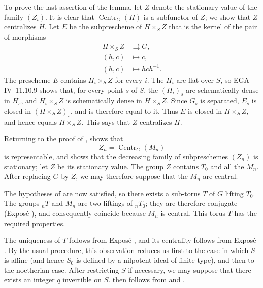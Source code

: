 To prove the last assertion of the lemma, let \(Z\) denote the
stationary value of the family \((Z_i)\). It is clear that
\(\operatorname{Centr}_G(H)\) is a subfunctor of \(Z\); we show that
\(Z\) centralizes \(H\). Let \(E\) be the subprescheme of
\(H\times_S Z\) that is the kernel of the pair of morphisms
\[
\begin{aligned}
  H\times_S Z&\rightrightarrows G,\\
  (h,c)&\longmapsto c,\\
  (h,c)&\longmapsto hch^{-1}.
\end{aligned}
\]
The prescheme \(E\) contains \(H_i\times_S Z\) for every \(i\). The
\(H_i\) are flat over \(S\), so EGA IV~11.10.9 shows that, for every
point \(s\) of \(S\), the \((H_i)_s\) are schematically dense in
\(H_s\), and \(H_i\times_S Z\) is schematically dense in
\(H\times_S Z\). Since \(G_s\) is separated, \(E_s\) is closed in
\((H\times_S Z)_s\), and is therefore equal to it. Thus \(E\) is
closed in \(H\times_S Z\), and hence equals \(H\times_S Z\). This says
that \(Z\) centralizes \(H\).

Returning to the proof of ,  shows that
\[
  Z_n=\operatorname{Centr}_G(M_n)
\]
is representable, and  shows that the decreasing family
of subpreschemes \((Z_n)\) is stationary; let \(Z\) be its stationary
value. The group \(Z\) contains \(T_0\) and all the \(M_n\). After
replacing \(G\) by \(Z\), we may therefore suppose that the \(M_n\)
are central.

The hypotheses of  are now satisfied, so there exists a
sub-torus \(T\) of \(G\) lifting \(T_0\). The groups \({}_nT\) and
\(M_n\) are two liftings of \({}_nT_0\); they are therefore conjugate
(Exposé ), and consequently coincide because \(M_n\) is
central. This torus \(T\) has the required properties.

The uniqueness of \(T\) follows from Exposé , and its
centrality follows from Exposé . By the usual procedure, this
observation reduces us first to the case in which \(S\) is affine
(and hence \(S_0\) is defined by a nilpotent ideal of finite type),
and then to the noetherian case. After restricting \(S\) if necessary,
we may suppose that there exists an integer \(q\) invertible on \(S\).
 then follows from  and .

